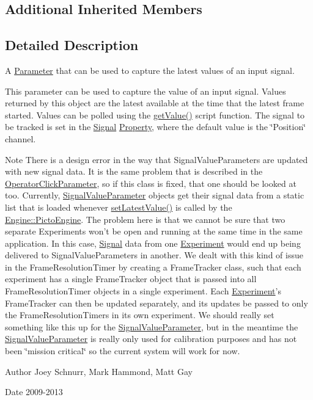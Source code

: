 \subsection*{Additional Inherited Members}


\subsection{Detailed Description}
A \hyperlink{class_picto_1_1_parameter}{Parameter} that can be used to capture the latest values of an input signal. 

This parameter can be used to capture the value of an input signal. Values returned by this object are the latest available at the time that the latest frame started. Values can be polled using the \hyperlink{class_picto_1_1_signal_value_parameter_a91b58a4c687a68375c05d6743f211cd5}{get\-Value()} script function. The signal to be tracked is set in the \hyperlink{class_picto_1_1_signal}{Signal} \hyperlink{class_picto_1_1_property}{Property}, where the default value is the \char`\"{}\-Position\char`\"{} channel. \begin{DoxyNote}{Note}
There is a design error in the way that Signal\-Value\-Parameters are updated with new signal data. It is the same problem that is described in the \hyperlink{class_picto_1_1_operator_click_parameter}{Operator\-Click\-Parameter}, so if this class is fixed, that one should be looked at too. Currently, \hyperlink{class_picto_1_1_signal_value_parameter}{Signal\-Value\-Parameter} objects get their signal data from a static list that is loaded whenever \hyperlink{class_picto_1_1_signal_value_parameter_af9b2ee3a6b6b95b741b64f0a2b13efd0}{set\-Latest\-Value()} is called by the \hyperlink{class_picto_1_1_engine_1_1_picto_engine}{Engine\-::\-Picto\-Engine}. The problem here is that we cannot be sure that two separate Experiments won't be open and running at the same time in the same application. In this case, \hyperlink{class_picto_1_1_signal}{Signal} data from one \hyperlink{class_picto_1_1_experiment}{Experiment} would end up being delivered to Signal\-Value\-Parameters in another. We dealt with this kind of issue in the Frame\-Resolution\-Timer by creating a Frame\-Tracker class, such that each experiment has a single Frame\-Tracker object that is passed into all Frame\-Resolution\-Timer objects in a single experiment. Each \hyperlink{class_picto_1_1_experiment}{Experiment}'s Frame\-Tracker can then be updated separately, and its updates be passed to only the Frame\-Resolution\-Timers in its own experiment. We should really set something like this up for the \hyperlink{class_picto_1_1_signal_value_parameter}{Signal\-Value\-Parameter}, but in the meantime the \hyperlink{class_picto_1_1_signal_value_parameter}{Signal\-Value\-Parameter} is really only used for calibration purposes and has not been \char`\"{}mission critical\char`\"{} so the current system will work for now. 
\end{DoxyNote}
\begin{DoxyAuthor}{Author}
Joey Schnurr, Mark Hammond, Matt Gay 
\end{DoxyAuthor}
\begin{DoxyDate}{Date}
2009-\/2013 
\end{DoxyDate}


